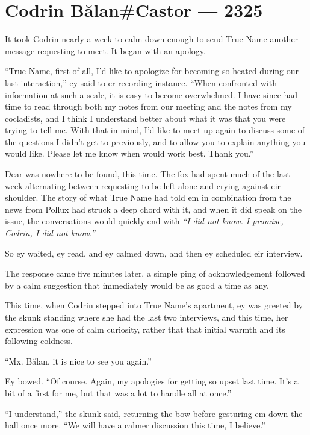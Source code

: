 \hypertarget{codrin-bux103lancastor-2325}{%
\chapter{Codrin Bălan\#Castor — 2325}\label{codrin-bux103lancastor-2325}}

It took Codrin nearly a week to calm down enough to send True Name another message requesting to meet. It began with an apology.

``True Name, first of all, I'd like to apologize for becoming so heated during our last interaction,'' ey said to er recording instance. ``When confronted with information at such a scale, it is easy to become overwhelmed. I have since had time to read through both my notes from our meeting and the notes from my cocladists, and I think I understand better about what it was that you were trying to tell me. With that in mind, I'd like to meet up again to discuss some of the questions I didn't get to previously, and to allow you to explain anything you would like. Please let me know when would work best. Thank you.''

Dear was nowhere to be found, this time. The fox had spent much of the last week alternating between requesting to be left alone and crying against eir shoulder. The story of what True Name had told em in combination from the news from Pollux had struck a deep chord with it, and when it did speak on the issue, the conversations would quickly end with \emph{``I did not know. I promise, Codrin, I did not know.''}

So ey waited, ey read, and ey calmed down, and then ey scheduled eir interview.

The response came five minutes later, a simple ping of acknowledgement followed by a calm suggestion that immediately would be as good a time as any.

This time, when Codrin stepped into True Name's apartment, ey was greeted by the skunk standing where she had the last two interviews, and this time, her expression was one of calm curiosity, rather that that initial warmth and its following coldness.

``Mx. Bălan, it is nice to see you again.''

Ey bowed. ``Of course. Again, my apologies for getting so upset last time. It's a bit of a first for me, but that was a lot to handle all at once.''

``I understand,'' the skunk said, returning the bow before gesturing em down the hall once more. ``We will have a calmer discussion this time, I believe.''

